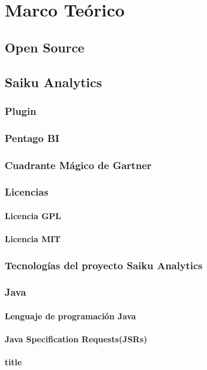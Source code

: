 \chapter{Marco Teórico} \label{chapter:II}
\section{Open Source}
\section{Saiku Analytics}
	\subsection{Plugin}
	\subsection{Pentago BI}
	\subsection{Cuadrante M\'{a}gico de Gartner}
	\subsection{Licencias}
		\subsubsection{Licencia GPL}
		\subsubsection{Licencia MIT}
	\subsection{Tecnolog\'{i}as del proyecto Saiku Analytics}		
	\subsection{Java}
		\subsubsection{Lenguaje de programaci\'{o}n Java}
		\subsubsection{Java Specification Requests(JSRs)}
		\subsubsection{title}